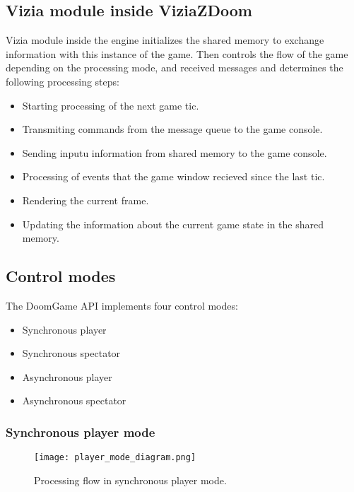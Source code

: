 \subsection{Vizia module inside ViziaZDoom}\label{sec:architecture_inside_viziazdoom}

Vizia module inside the engine initializes the shared memory to exchange information with this instance of the game. Then controls the flow of the game depending on the processing mode, and received messages and determines the following processing steps:

    \begin{itemize}
    \item Starting processing of the next game tic.
    \item Transmiting commands from the message queue to the game console.
    \item Sending inputu information from shared memory to the game console.
    \item Processing of events that the game window recieved since the last tic.
    \item Rendering the current frame.
    \item Updating the information about the current game state in the shared memory.
    \end{itemize}

\subsection{Control modes}\label{sec:architecture_modes}

The DoomGame API implements four control modes:
    
    \begin{itemize}
    \item Synchronous player
    \item Synchronous spectator
    \item Asynchronous player
    \item Asynchronous spectator
    \end{itemize}
    
    \subsubsection{Synchronous player mode}\label{sec:architecture_player_mode}
    
        \begin{figure}
			    \centering
			    \texttt{[image: player\_mode\_diagram.png]}
			    \caption{Processing flow in synchronous player mode.}\label{fig:player_mode_diagram}
	    \end{figure}
        
